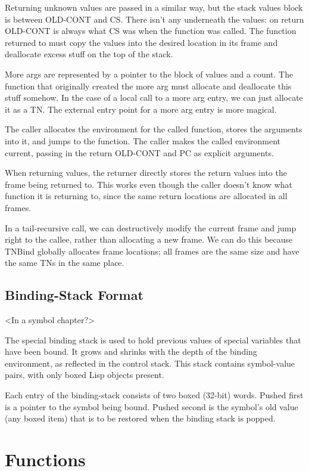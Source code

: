 {\begin{itemize, spread 0, spacing 1}
Returning unknown values are passed in a similar way, but the stack values
block is between OLD-CONT and CS.  There isn't any underneath the values: on
return OLD-CONT is always what CS was when the function was called.  The
function returned to must copy the values into the desired location in its
frame and deallocate excess stuff on the top of the stack.

More args are represented by a pointer to the block of values and a count.  The
function that originally created the more arg must allocate and deallocate this
stuff somehow.  In the case of a local call to a more arg entry, we can just
allocate it as a TN.  The external entry point for a more arg entry is more
magical.



The caller allocates the environment for the called function, stores the
arguments into it, and jumps to the function.  The caller makes the called
environment current, passing in the return OLD-CONT and PC as explicit arguments.

When returning values, the returner directly stores the return values into the
frame being returned to.  This works even though the caller doesn't know what
function it is returning to, since the same return locations are allocated in
all frames.

In a tail-recursive call, we can destructively modify the current frame and
jump right to the callee, rather than allocating a new frame.  We can do this
because TNBind globally allocates frame locations; all frames are the same size
and have the same TNs in the same place.


\section{Binding-Stack Format}
\comment<In a symbol chapter?>


The special binding stack is used to hold previous values of special variables
that have been bound.  It grows and shrinks with the depth of the binding
environment, as reflected in the control stack. This stack contains
symbol-value pairs, with only boxed Lisp objects present.

Each entry of the binding-stack consists of two boxed (32-bit) words.  Pushed
first is a pointer to the symbol being bound.  Pushed second is the symbol's
old value (any boxed item) that is to be restored when the binding stack is
popped.


\chapter{Functions}


\end{itemize, spread 0, spacing 1}}
